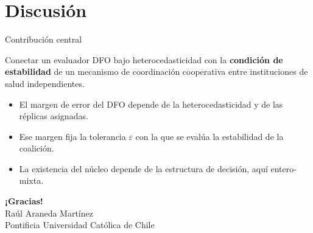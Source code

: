 \documentclass[aspectratio=169,11pt,xcolor=table]{beamer}
\begin{document}
\section{Discusión}

\begin{frame}{Contribución central}
  \vfill
  \begin{center}
    \large Conectar un evaluador DFO bajo heterocedasticidad con la
    \textcolor{ucblue}{\textbf{condición de estabilidad}} de un mecanismo de
    coordinación cooperativa entre instituciones de salud independientes.
  \end{center}
  \vfill
  \begin{itemize}
    \item<2-> El margen de error del DFO depende de la heterocedasticidad y de las réplicas asignadas.
    \item<3-> Ese margen fija la tolerancia $\varepsilon$ con la que se evalúa la estabilidad de la coalición.
    \item<4-> La existencia del núcleo depende de la estructura de decisión, aquí entero-mixta.
  \end{itemize}
\end{frame}

\begin{frame}[plain]
  \vfill
  \begin{center}
    {\Huge\bfseries\color{ucblue} ¡Gracias!}\\[1em]
    {\large Raúl Araneda Martínez}\\
    Pontificia Universidad Católica de Chile
  \end{center}
  \vfill
\end{frame}
\end{document}
